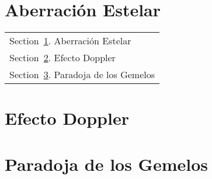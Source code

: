 \documentclass[../main]{subfiles}
\begin{document}
\section{Aberración Estelar}\label{Sec:Aberración}
        \begin{margintable}\vspace{1.4in}\footnotesize
		\begin{tabularx}{\marginparwidth}{|X}
        Section~\ref{Sec:Aberración}. Aberración Estelar\\
		Section~\ref{Sec:Doppler}. Efecto Doppler\\
        Section~\ref{Sec:Gemelos}. Paradoja de los Gemelos\\
		\end{tabularx}
        \end{margintable}
        
        \lipsum[1]
        
        \section{Efecto Doppler}\label{Sec:Doppler}
        \begin{fullpage}
            \lipsum[1]
        \end{fullpage}

        \section{Paradoja de los Gemelos}\label{Sec:Gemelos}
        \begin{fullpage}
            \lipsum[1]
        \end{fullpage}
\end{document}
